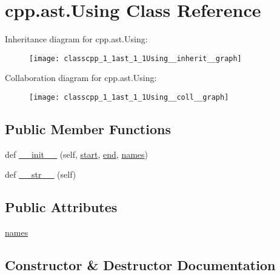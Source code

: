 \hypertarget{classcpp_1_1ast_1_1Using}{}\section{cpp.\+ast.\+Using Class Reference}
\label{classcpp_1_1ast_1_1Using}


Inheritance diagram for cpp.\+ast.\+Using\+:\nopagebreak
\begin{figure}[H]
\begin{center}
\leavevmode
\texttt{[image: classcpp\_1\_1ast\_1\_1Using\_\_inherit\_\_graph]}
\end{center}
\end{figure}


Collaboration diagram for cpp.\+ast.\+Using\+:\nopagebreak
\begin{figure}[H]
\begin{center}
\leavevmode
\texttt{[image: classcpp\_1\_1ast\_1\_1Using\_\_coll\_\_graph]}
\end{center}
\end{figure}
\subsection*{Public Member Functions}
\begin{DoxyCompactItemize}
\item 
def \hyperlink{classcpp_1_1ast_1_1Using_a9b7a760a06d00f7211c889d9841e06af}{\+\_\+\+\_\+init\+\_\+\+\_\+} (self, \hyperlink{classcpp_1_1ast_1_1Node_a7b2aa97e6a049bb1a93aea48c48f1f44}{start}, \hyperlink{classcpp_1_1ast_1_1Node_a3c5e5246ccf619df28eca02e29d69647}{end}, \hyperlink{classcpp_1_1ast_1_1Using_abc05dedb59eb83857d373cc0e64eccb3}{names})
\item 
def \hyperlink{classcpp_1_1ast_1_1Using_ac209e8e5d84988d14a8f4b30377e5455}{\+\_\+\+\_\+str\+\_\+\+\_\+} (self)
\end{DoxyCompactItemize}
\subsection*{Public Attributes}
\begin{DoxyCompactItemize}
\item 
\hyperlink{classcpp_1_1ast_1_1Using_abc05dedb59eb83857d373cc0e64eccb3}{names}
\end{DoxyCompactItemize}


\subsection{Constructor \& Destructor Documentation}
